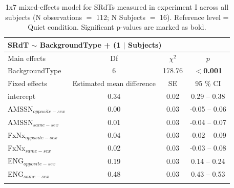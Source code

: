 \documentclass[a4paper, twoside]{templates/ociamthesis}
\begin{document}
\begin{table}[ht]
\center
\caption{\label{tab:Exp1_LMEM}{1x7 mixed-effects model for SRdTs measured in experiment I across all subjects (N observations $=$ 112; N Subjects $=$ 16). Reference level = Quiet condition. Significant p-values are marked as bold.}}
\renewcommand{\arraystretch}{2}
\begin{tabular}{lccc}
\hline \hline
\multicolumn{4}{l}{SRdT $\sim$ BackgroundType + (1 $\mid$ Subjects)}                               \\ \hline
Main effects           & Df                        & $\chi^2$ & $p$                                  \\ \hline
BackgroundType         & 6                         & 178.76   & \textbf{$<$0.001} \\ \hline
Fixed effects          & Estimated mean difference & SE       & 95 \% CI                           \\ \hline
intercept              & 0.34                      & 0.02     & 0.29 – 0.38                        \\
AMSSN$_{opposite-sex}$ & 0.00                      & 0.03     & -0.05 – 0.06                       \\
AMSSN$_{same-sex}$     & 0.01                      & 0.03     & -0.04 – 0.07                       \\
FxNx$_{opposite-sex}$  & 0.04                      & 0.03     & -0.02 – 0.09                       \\
FxNx$_{same-sex}$      & 0.02                      & 0.03     & -0.03 – 0.08                       \\
ENG$_{opposite-sex}$   & 0.19                      & 0.03     & 0.14 – 0.24                        \\
ENG$_{same-sex}$       & 0.48                      & 0.03     & 0.43 – 0.53                        \\ \hline \hline
\\
\end{tabular}
\end{table}
\end{document}

